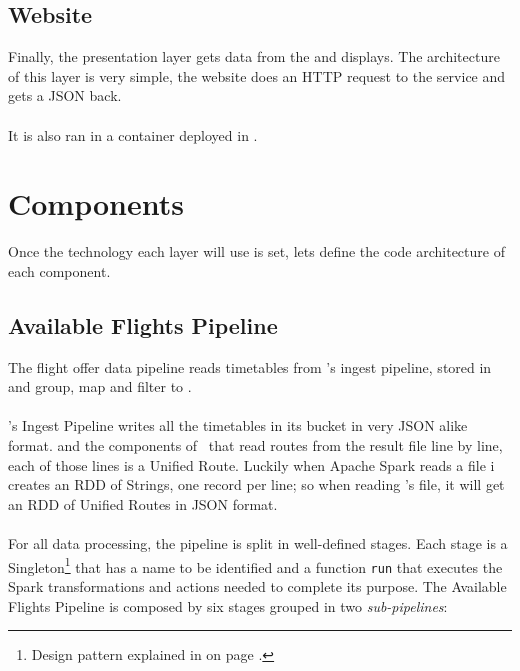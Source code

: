 
\subsection{Website}

Finally, the presentation layer gets data from the  and displays. The architecture of this layer is very simple, the website does an HTTP request to the service and gets a JSON back.
\\\\
It is also ran in a  container deployed in .


\section{Components}

Once the technology each layer will use is set, lets define the code architecture of each component.


\subsection{Available Flights Pipeline} \label{available-flights-pipeline}

The flight offer data pipeline reads timetables from \squad's ingest pipeline, stored in  and group, map and filter to .
\\\\
\squad's Ingest Pipeline writes all the timetables in its  bucket in very JSON\cite{json} alike format.  and the components of \squad\ that read routes from the result file line by line, each of those lines is a Unified Route. Luckily when Apache Spark reads a file i creates an RDD of Strings, one record per line; so when reading \squad's file, it will get an RDD of Unified Routes in JSON\cite{json} format.
\\\\
For all data processing, the pipeline is split in well-defined stages. Each stage is a Singleton\footnote{Design pattern explained in  on page \pageref{appendix_b}.} that has a name to be identified and a function \texttt{run} that executes the Spark transformations and actions needed to complete its purpose. The Available Flights Pipeline is composed by six stages grouped in two \textit{sub-pipelines}:

